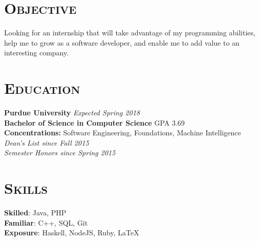 
\hypersetup{backref,pdfpagemode=Full,colorlinks=true,backref}

\addtolength{\oddsidemargin}{-0.45in}
\addtolength{\voffset}{-0.20in}
\addtolength{\textwidth}{0.85in} 
\addtolength{\textheight}{1.00in}

\renewcommand{\namefont}{\LARGE\emph}




\address{ryndvs96@gmail.com \ \ \ \ \ github.com/ryndvs96}
\begin{resume}


  \section{\textsc{Objective}}

  Looking for an internship that will take advantage of my programming abilities, help me to grow as a software developer, and enable me to add value to an interesting company.


  \section{\textsc{Education}}

  \textbf{Purdue University} \hfill \emph{Expected Spring 2018} \\
  \textbf{Bachelor of Science in Computer Science} \hfill GPA 3.69\\
  \textbf{Concentrations:} Software Engineering, Foundations, Machine Intelligence\\
  \emph{Dean's List since Fall 2015}\\
  \emph{Semester Honors since Spring 2015}

  \section{\textsc{Skills}}

  \small{\textbf{Skilled}: }\normalsize{Java, PHP}\\
  \small{\textbf{Familiar}: }\normalsize{C++, SQL, Git}\\
  \small{\textbf{Exposure}: }\normalsize{Haskell, NodeJS, Ruby, \LaTeX}


\end{resume}
